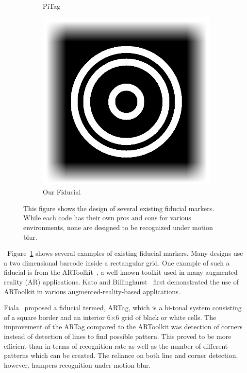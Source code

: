 \documentclass[10pt,twocolumn,letterpaper]{article}
\begin{document}
\begin{figure}
\begin{subfigure}[b]{0.12\linewidth}
  PiTag\quad~\cite{Pitag13}
 \end{subfigure}\quad
 \begin{subfigure}[b]{0.14\linewidth}
  \centering
  \includegraphics[width=\linewidth]{our_fiducial}
  Our Fiducial
 \end{subfigure}
 \caption{This figure shows the design of several existing fiducial markers.  While
 each code has their own pros and cons for various environments, none are
 designed to be recognized under motion blur.}
 \label{fig:previous_work}
\end{figure}

~Figure~\ref{fig:previous_work} shows several
examples of existing fiducial markers.  Many designs use a two dimensional
barcode inside a rectangular grid. One example of such a fiducial is from the
ARToolkit~\cite{ARToolkit02}, a well known toolkit used in many augmented
reality (AR) applications. Kato and Billinghurst~\cite{kato-artoolkit}
first demonstrated the use of ARToolkit in various augmented-reality-based applications.

Fiala~\cite{Fiala05} proposed a fiducial termed, ARTag, which is a
bi-tonal system consisting of a square border and an interior 6$\times$6 grid
of black or white cells. The improvement of the ARTag compared to the ARToolkit was
detection of corners instead of detection of lines to find possible pattern.
This proved to be more efficient than \cite{ARToolkit02} in terms of
recognition rate as well as the number of different patterns which can be
created.   The reliance on both line and corner detection, however, hampers recognition
under motion blur.
\end{document}
